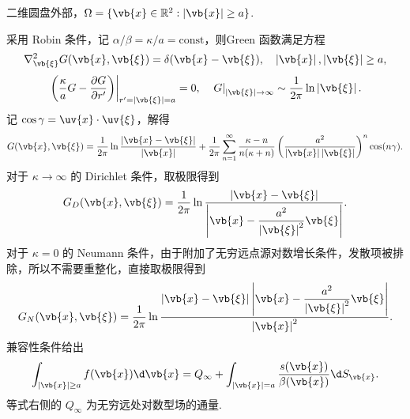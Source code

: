 \begin{example}
	二维圆盘外部，\(\Omega=\{\vb{x}\in\mathbb{R}^2:\left|\vb{x}\right|\geq a\}\).
	
	采用 Robin 条件，记 \(\alpha/\beta=\kappa/a=\mathrm{const}\)，则Green 函数满足方程
	\begin{equation*}
		\nabla_{\vb{\xi}}^2G(\vb{x},\vb{\xi})=\delta(\vb{x}-\vb{\xi}),\quad
		\left|\vb{x}\right|,\left|\vb{\xi}\right|\geq a,
	\end{equation*}
	\begin{equation*}
		\left.\left(\frac{\kappa}{a}G-\frac{\partial G}{\partial r'}\right)\right|_{r'=\left|\vb{\xi}\right|=a}=0,
		\quad
		\left.G\right|_{\left|\vb{\xi}\right|\to\infty}\sim\frac{1}{2\pi}\ln\left|\vb{\xi}\right|.
	\end{equation*}
	记 \(\cos\gamma=\uv{x}\cdot\uv{\xi}\)，解得
	\begin{equation*}
		G(\vb{x},\vb{\xi})
		=\frac{1}{2\pi}\ln\frac{\left|\vb{x}-\vb{\xi}\right|}{\left|\vb{x}\right|}
		+\frac{1}{2\pi}\sum_{n=1}^\infty\frac{\kappa-n}{n(\kappa+n)}\left(\frac{a^2}{\left|\vb{x}\right|\left|\vb{\xi}\right|}\right)^n\cos(n\gamma).
	\end{equation*}
	对于 \(\kappa\to\infty\) 的 Dirichlet 条件，取极限得到
	\begin{equation*}
		G_D(\vb{x},\vb{\xi})
		=\frac{1}{2\pi}\ln\frac{\left|\vb{x}-\vb{\xi}\right|}{\left|\vb{x}-\dfrac{a^2}{\left|\vb{\xi}\right|^2}\vb{\xi}\right|}.
	\end{equation*}
	对于 \(\kappa=0\) 的 Neumann 条件，由于附加了无穷远点源对数增长条件，发散项被排除，所以不需要重整化，直接取极限得到
	\begin{equation*}
		G_N(\vb{x},\vb{\xi})
		=\frac{1}{2\pi}\ln\frac{\left|\vb{x}-\vb{\xi}\right|\left|\vb{x}-\dfrac{a^2}{\left|\vb{\xi}\right|^2}\vb{\xi}\right|}{\left|\vb{x}\right|^2}.
	\end{equation*}
	兼容性条件给出
	\begin{equation*}
		\int_{\left|\vb{x}\right|\geq a}f(\vb{x})\d\vb{x}
		=Q_\infty+\int_{\left|\vb{x}\right|=a}\frac{s(\vb{x})}{\beta(\vb{x})}\d S_{\vb{x}}.
	\end{equation*}
	等式右侧的 \(Q_\infty\) 为无穷远处对数型场的通量.
\end{example}

